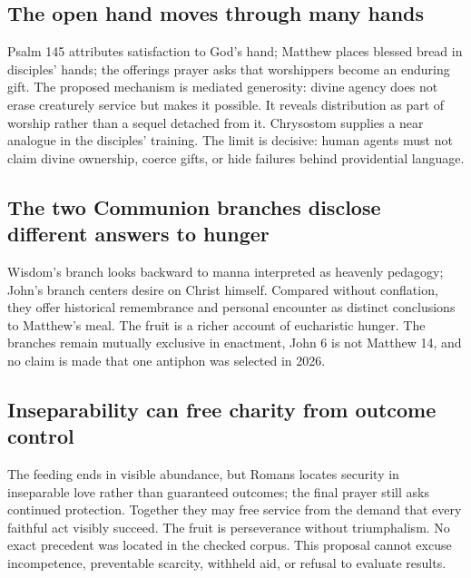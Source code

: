 \subsection*{The open hand moves through many hands\enspace{}}
Psalm 145 attributes satisfaction to God's hand; Matthew places blessed bread in disciples' hands; the offerings prayer asks that worshippers become an enduring gift. The proposed mechanism is mediated generosity: divine agency does not erase creaturely service but makes it possible. It reveals distribution as part of worship rather than a sequel detached from it. Chrysostom supplies a near analogue in the disciples' training. The limit is decisive: human agents must not claim divine ownership, coerce gifts, or hide failures behind providential language.

\subsection*{The two Communion branches disclose different answers to hunger\enspace{}}
Wisdom's branch looks backward to manna interpreted as heavenly pedagogy; John's branch centers desire on Christ himself. Compared without conflation, they offer historical remembrance and personal encounter as distinct conclusions to Matthew's meal. The fruit is a richer account of eucharistic hunger. The branches remain mutually exclusive in enactment, John 6 is not Matthew 14, and no claim is made that one antiphon was selected in 2026.

\subsection*{Inseparability can free charity from outcome control\enspace{}}
The feeding ends in visible abundance, but Romans locates security in inseparable love rather than guaranteed outcomes; the final prayer still asks continued protection. Together they may free service from the demand that every faithful act visibly succeed. The fruit is perseverance without triumphalism. No exact precedent was located in the checked corpus. This proposal cannot excuse incompetence, preventable scarcity, withheld aid, or refusal to evaluate results.
